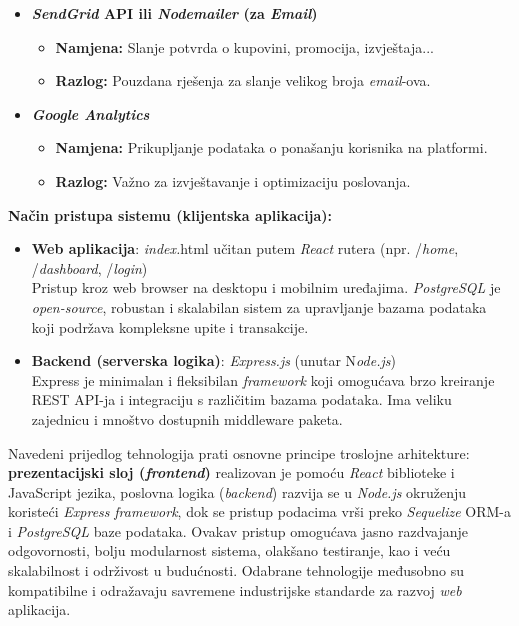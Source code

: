 \begin{itemize}
    \item \textbf{\textit{SendGrid }API ili \textit{Nodemailer} (za \textit{Email})} \begin{itemize}
        \item \textbf{Namjena:} Slanje potvrda o kupovini, promocija, izvještaja...
        \item \textbf{Razlog:} Pouzdana rješenja za slanje velikog broja \textit{email}-ova.
    \end{itemize}
    \item \textbf{\textit{Google Analytics}}\begin{itemize}
        \item \textbf{Namjena:} Prikupljanje podataka o ponašanju korisnika na platformi.
        \item \textbf{Razlog:} Važno za izvještavanje i optimizaciju poslovanja.
    \end{itemize}
\end{itemize} 
\textbf{Način pristupa sistemu (klijentska aplikacija):}
\begin{itemize}  
    \item \textbf{Web aplikacija}: \textit{index.}html učitan putem \textit{React} rutera (npr. /\textit{home}, /\textit{dashboard}, /\textit{login})\\
    Pristup kroz web browser na desktopu i mobilnim uređajima.
    \textit{PostgreSQL} je \textit{open-source}, robustan i skalabilan sistem za upravljanje bazama podataka koji podržava kompleksne upite i transakcije. 
    \item \textbf{Backend (serverska logika)}: \textit{Express.js} (unutar N\textit{ode.js})\\
    Express je minimalan i fleksibilan \textit{framework} koji omogućava brzo kreiranje REST API-ja i integraciju s različitim bazama podataka. Ima veliku zajednicu i mnoštvo dostupnih middleware paketa.
\end{itemize} 
Navedeni prijedlog tehnologija prati osnovne principe troslojne arhitekture: \textbf{prezentacijski sloj (\textit{frontend})} realizovan je pomoću \textit{React} biblioteke i JavaScript jezika, poslovna logika (\textit{backend}) razvija se u \textit{Node.js }okruženju koristeći \textit{Express} \textit{framework}, dok se pristup podacima vrši preko \textit{Sequelize} ORM-a i \textit{PostgreSQL} baze podataka. Ovakav pristup omogućava jasno razdvajanje odgovornosti, bolju modularnost sistema, olakšano testiranje, kao i veću skalabilnost i održivost u budućnosti. Odabrane tehnologije međusobno su kompatibilne i odražavaju savremene industrijske standarde za razvoj \textit{web} aplikacija.

